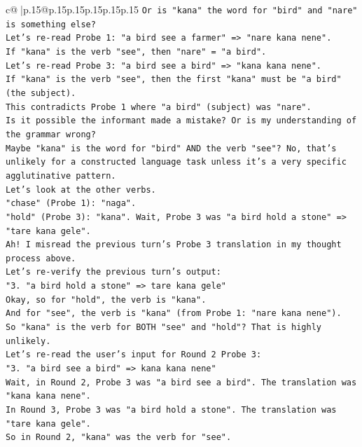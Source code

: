 \documentclass{article}
\begin{document}
{\begin{supertabular}{c@{$\;$}|p{.15\linewidth}@{}p{.15\linewidth}p{.15\linewidth}p{.15\linewidth}p{.15\linewidth}p{.15\linewidth}}
{{{\texttt{Or is "kana" the word for "bird" and "nare" is something else?} \\
\texttt{Let's re{-}read Probe 1: "a bird see a farmer" => "nare kana nene".} \\
\texttt{If "kana" is the verb "see", then "nare" = "a bird".} \\
\texttt{Let's re{-}read Probe 3: "a bird see a bird" => "kana kana nene".} \\
\texttt{If "kana" is the verb "see", then the first "kana" must be "a bird" (the subject).} \\
\texttt{This contradicts Probe 1 where "a bird" (subject) was "nare".} \\
\texttt{Is it possible the informant made a mistake? Or is my understanding of the grammar wrong?} \\
\texttt{Maybe "kana" is the word for "bird" AND the verb "see"? No, that's unlikely for a constructed language task unless it's a very specific agglutinative pattern.} \\
\texttt{Let's look at the other verbs.} \\
\texttt{"chase" (Probe 1): "naga".} \\
\texttt{"hold" (Probe 3): "kana". Wait, Probe 3 was "a bird hold a stone" => "tare kana gele".} \\
\texttt{Ah! I misread the previous turn's Probe 3 translation in my thought process above.} \\
\texttt{Let's re{-}verify the previous turn's output:} \\
\texttt{"3. "a bird hold a stone" => tare kana gele"} \\
\texttt{Okay, so for "hold", the verb is "kana".} \\
\texttt{And for "see", the verb is "kana" (from Probe 1: "nare kana nene").} \\
\texttt{So "kana" is the verb for BOTH "see" and "hold"? That is highly unlikely.} \\
\texttt{Let's re{-}read the user's input for Round 2 Probe 3:} \\
\texttt{"3. "a bird see a bird" => kana kana nene"} \\
\texttt{Wait, in Round 2, Probe 3 was "a bird see a bird". The translation was "kana kana nene".} \\
\texttt{In Round 3, Probe 3 was "a bird hold a stone". The translation was "tare kana gele".} \\
\texttt{So in Round 2, "kana" was the verb for "see".} \\
}}}
\end{supertabular}}
\end{document}

